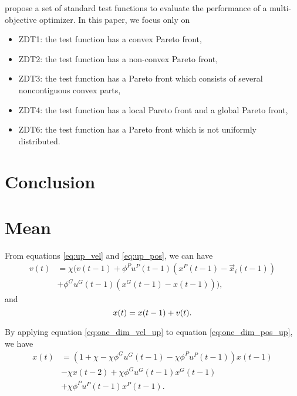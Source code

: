 \documentclass[12pt]{article}
\begin{document}
\cite{zitzler2000comparison} propose a set of standard test functions to evaluate the performance of a multi-objective optimizer.
In this paper, we focus only on
\begin{itemize}
\item ZDT1: the test function has a convex Pareto front,
\item ZDT2: the test function has a non-convex Pareto front,
\item ZDT3: the test function has a Pareto front which consists of several noncontiguous convex parts,
\item ZDT4: the test function has a local Pareto front and a global Pareto front,
\item ZDT6: the test function has a Pareto front which is not uniformly distributed.
\end{itemize}

\section{Conclusion}







\appendix

\section{Mean}
\label{sec:app:mean}

From equations \eqref{eq:up_vel} and \eqref{eq:up_pos}, we can have
\begin{equation}
\label{eq:one_dim_vel_up}
\begin{aligned}
v(t) & = \chi ( v(t-1) + \phi^{P} u^{P}(t-1) (x^{P}(t-1) - \vec{x}_{i}(t-1)) \\
& + \phi^{G} u^{G}(t-1) (x^{G}(t-1) - x(t-1))  ),
\end{aligned}
\end{equation}
and 
\begin{equation}
\label{eq:one_dim_pos_up}
x(t) = x(t-1) + v(t). \\
\end{equation}

By applying equation \eqref{eq:one_dim_vel_up} to equation \eqref{eq:one_dim_pos_up}, we have
\begin{equation}
\label{eq:one_dim_pos_up2}
\begin{aligned}
x(t) & = ( 1 + \chi - \chi \phi^{G} u^{G}(t-1) - \chi \phi^{P} u^{P}(t-1) ) x(t-1) \\
& - \chi x(t-2) + \chi \phi^{G} u^{G}(t-1) x^{G}(t-1) \\
& + \chi \phi^{P} u^{P}(t-1) x^{P}(t-1).
\end{aligned}
\end{equation}
\end{document}
